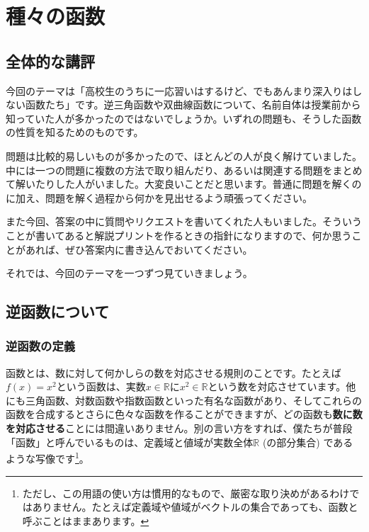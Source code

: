 \chapter{種々の函数}


\section{全体的な講評}

今回のテーマは「高校生のうちに一応習いはするけど、でもあんまり深入りはしない函数たち」です。逆三角函数や双曲線函数について、名前自体は授業前から知っていた人が多かったのではないでしょうか。いずれの問題も、そうした函数の性質を知るためのものです。

問題は比較的易しいものが多かったので、ほとんどの人が良く解けていました。中には一つの問題に複数の方法で取り組んだり、あるいは関連する問題をまとめて解いたりした人がいました。大変良いことだと思います。普通に問題を解くのに加え、問題を解く過程から何かを見出せるよう頑張ってください。

また今回、答案の中に質問やリクエストを書いてくれた人もいました。そういうことが書いてあると解説プリントを作るときの指針になりますので、何か思うことがあれば、ぜひ答案内に書き込んでおいてください。

それでは、今回のテーマを一つずつ見ていきましょう。

\section{逆函数について}


\subsection{逆函数の定義}

函数とは、数に対して何かしらの数を対応させる規則のことです。たとえば$f(x)=x^2$という函数は、実数$x\in\mathbb{R}$に$x^2\in\mathbb{R}$という数を対応させています。他にも三角函数、対数函数や指数函数といった有名な函数があり、そしてこれらの函数を合成するとさらに色々な函数を作ることができますが、どの函数も\textbf{数に数を対応させる}ことには間違いありません。別の言い方をすれば、僕たちが普段「函数」と呼んでいるものは、定義域と値域が実数全体$\mathbb{R}$ (の部分集合) であるような写像です\footnote{ただし、この用語の使い方は慣用的なもので、厳密な取り決めがあるわけではありません。たとえば定義域や値域がベクトルの集合であっても、函数と呼ぶことはままあります。}。

